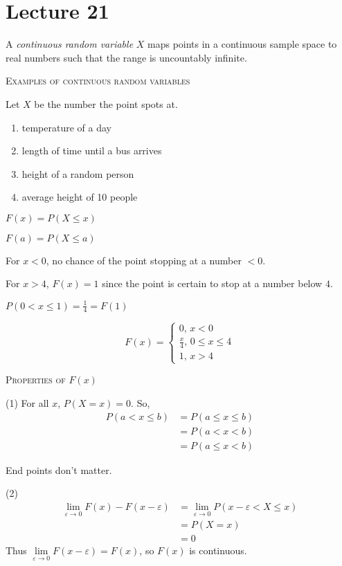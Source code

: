 \section{Lecture 21}
A \emph{continuous random variable} $ X $ maps points in a continuous
sample space to real numbers such that the range is uncountably infinite.

\textsc{Examples of continuous random variables}

Let $ X $ be the number the point spots at.
\begin{enumerate}[(1)]
    \item temperature of a day
    \item length of time until a bus arrives
    \item height of a random person
    \item average height of 10 people
\end{enumerate}

$F(x)=P(X\le x)$

$F(a)=P(X\le a) $


For $ x<0 $, no chance of the point stopping at a number $ <0 $.

For $ x>4 $, $ F(x)=1 $ since the point is certain to stop at a number
below $ 4 $.

$ P(0<x\le 1)=\frac{1}{4}=F(1) $

\[ F(x)=\begin{cases}
    0,\, x<0\\
    \frac{x}{4},\,0\le x\le 4 \\
    1,\,x>4
\end{cases} \]

\textsc{Properties of $ F(x) $}

(1) For all $ x $, $ P(X=x)=0 $. So,
\begin{align*}
    P(a<x\le b)&=P(a\le x\le b)\\
    &=P(a<x<b)\\
    &=P(a\le x<b)
\end{align*}
\begin{remark}
    End points don't matter.
\end{remark}

(2) \begin{align*}
    \lim\limits_{{\varepsilon} \to {0}} F(x)-F(x-\varepsilon)&=
    \lim\limits_{{\varepsilon} \to {0}} P(x-\varepsilon<X\le x)\\
    &=P(X=x)\\
    &=0
\end{align*}
Thus $ \lim\limits_{{\varepsilon} \to {0}} F(x-\varepsilon)=F(x) $, so
$ F(x) $ is continuous.

